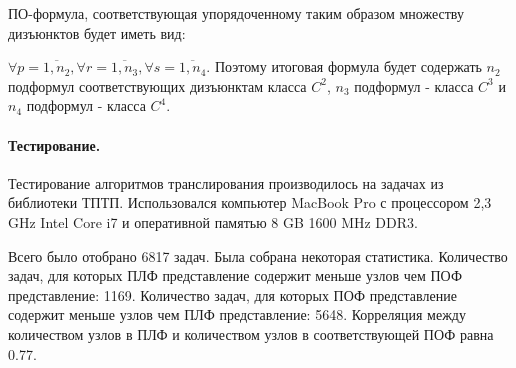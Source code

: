 \documentclass[a4paper]{jctart15b}
\begin{document}
ПО-формула, соответствующая упорядоченному таким образом множеству дизъюнктов будет иметь вид:

\begin{center}
\end{center}

\noindent
$\forall p=\overline{1,n_2}, \forall r=\overline{1,n_3}, \forall s=\overline{1,n_4}$. Поэтому итоговая формула будет содержать $n_2$ подформул соответствующих дизъюнктам класса $C^2$, $n_3$ подформул - класса $C^3$ и $n_4$ подформул - класса $C^4$.







\paragraph{Тестирование.}

Тестирование алгоритмов транслирования производилось на задачах из библиотеки ТПТП. Использовался компьютер MacBook Pro с процессором 2,3 GHz Intel Core i7 и оперативной памятью 8 GB 1600 MHz DDR3.

Всего было отобрано 6817 задач. Была собрана некоторая статистика. Количество задач, для которых ПЛФ представление содержит меньше узлов чем ПОФ представление: 1169.
%
Количество задач, для которых ПОФ представление содержит меньше узлов чем ПЛФ представление: 5648.
Корреляция между количеством узлов в ПЛФ и количеством узлов в соответствующей ПОФ равна 0.77.
\end{document}
